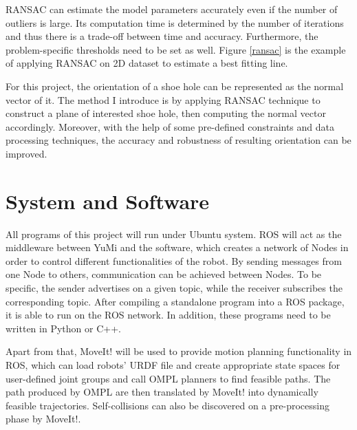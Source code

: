 RANSAC can estimate the model parameters accurately even if the number of outliers is large. Its computation time is determined by the number of iterations and thus there is a trade-off between time and accuracy. Furthermore, the problem-specific thresholds need to be set as well. Figure \ref{ransac} is the example of applying RANSAC on 2D dataset to estimate a best fitting line.

For this project, the orientation of a shoe hole can be represented as the normal vector of it. The method I introduce is by applying RANSAC technique to construct a plane of interested shoe hole, then computing the normal vector accordingly. Moreover, with the help of some pre-defined constraints and data processing techniques, the accuracy and robustness of resulting orientation can be improved.

\section{System and Software}
All programs of this project will run under Ubuntu system. ROS will act as the middleware between YuMi and the software, which creates a network of Nodes in order to control different functionalities of the robot. By sending messages from one Node to others, communication can be achieved between Nodes. To be specific, the sender advertises on a given topic, while the receiver subscribes the corresponding topic. After compiling a standalone program into a ROS package, it is able to run on the ROS network. In addition, these programs need to be written in Python or C++.

Apart from that, MoveIt! will be used to provide motion planning functionality in ROS, which can load robots' URDF file and create appropriate state spaces for user-defined joint groups and call OMPL planners to find feasible paths. The path produced by OMPL are then translated by MoveIt! into dynamically feasible trajectories. Self-collisions can also be discovered on a pre-processing phase by MoveIt!.

